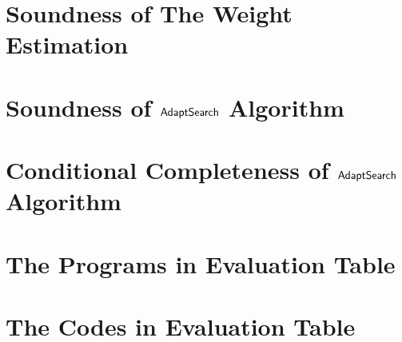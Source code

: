 \section{Soundness of The Weight Estimation}
\label{apdx:reachability_soundness}

\clearpage

\section{Soundness of $\mathsf{AdaptSearch}$ Algorithm}
\label{apdx:adaptalg_soundness}

\clearpage


\section{Conditional Completeness of $\mathsf{AdaptSearch}$ Algorithm}
\label{apdx:adaptalg_completeness}

\clearpage


% 

\section{The Programs in Evaluation Table}
\label{apdx:evaluated_examples}

\clearpage

\section{The Codes in Evaluation Table}
\label{apdx:evaluated_codes}

\clearpage

% 